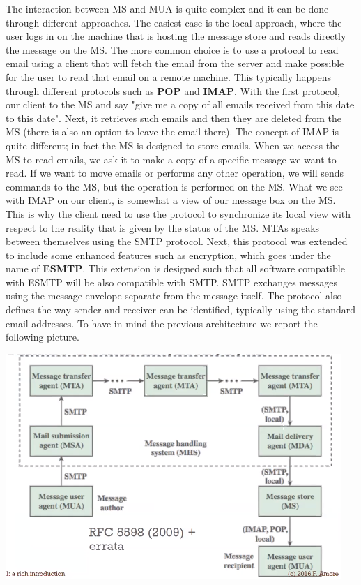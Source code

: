 The interaction between MS and MUA is quite complex and it can be done through different approaches. The easiest case is the local approach, where the user logs in on the machine that is hosting the message store and reads directly the message on the MS. The more common choice is to use a protocol to read email using a client that will fetch the email from the server and make possible for the user to read that email on a remote machine. This typically happens through different protocols such as \textbf{POP} and \textbf{IMAP}. With the first protocol, our client to the MS and say "give me a copy of all emails received from this date to this date". Next, it retrieves such emails and then they are deleted from the MS (there is also an option to leave the email there). The concept of IMAP is quite different; in fact the MS is designed to store emails. When we access the MS to read emails, we ask it to make a copy of a specific message we want to read. If we want to move emails or performs any other operation, we will sends commands to the MS, but the operation is performed on the MS. What we see with IMAP on our client, is somewhat a view of our message box on the MS. This is why the client need to use the protocol to synchronize its local view with respect to the reality that is given by the status of the MS. MTAs speaks between themselves using the SMTP protocol. Next, this protocol was extended to include some enhanced features such as encryption, which goes under the name of \textbf{ESMTP}. This extension is designed such that all software compatible with ESMTP will be also compatible with SMTP. SMTP exchanges messages using the message envelope separate from the message itself. The protocol also defines the way sender and receiver can be identified, typically using the standard email addresses. To have in mind the previous architecture we report the following picture.
\begin{center}
\includegraphics[scale=0.5]{./images/email_architecture.png}
\end{center}
